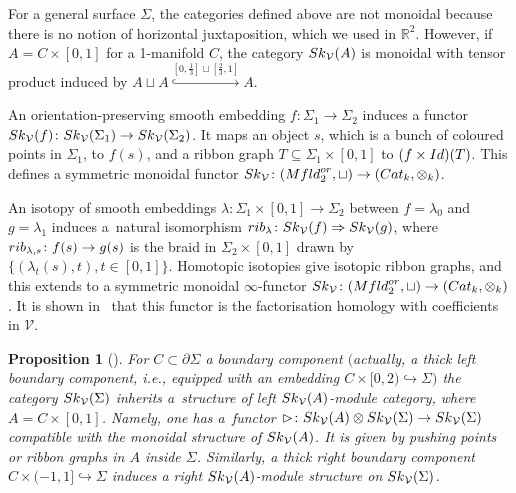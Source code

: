 \documentclass[11pt]{article}
\numberwithin{equation}{section}
\numberwithin{equation}{section}
\newtheorem{Proposition}[Theorem]{Proposition}
 { \theoremstyle{definition}
\newtheorem{Definition}[Theorem]{Definition}
\newtheorem{Note}[Theorem]{Note}
\newtheorem{Example}[Theorem]{Example}
\newtheorem{Remark}[Theorem]{Remark} }
\begin{document}
\begin{Remark}\label{Skmonoidal}
For a general surface $\Sigma$, the categories defined above are not monoidal because there is no notion of horizontal juxtaposition, which we used in $\mathbb{R}^2$. However, if $A = C \times [0,1]$ for a 1-manifold $C$, the category ${\rm Sk}_\mathcal{V}(A)$ is monoidal with tensor product induced by $A \sqcup A \overset{[0,\frac{1}{3}]\sqcup[\frac{2}{3},1]}\hookrightarrow A$.
\end{Remark}

\begin{Remark}\label{rmkFunctEmbIsotOfSkCat} An orientation-preserving smooth embedding $f\colon\Sigma_1 \allowbreak\to \Sigma_2$ induces a functor ${\rm Sk}_\mathcal{V}(f)\colon{\rm Sk}_\mathcal{V}(\Sigma_1)\to {\rm Sk}_\mathcal{V}(\Sigma_2)$. It maps an object $s$, which is a bunch of coloured points in $\Sigma_1$, to $f(s)$, and a ribbon graph $T \subseteq \Sigma_1 \times [0,1]$ to $(f\times {\rm Id})(T)$. This defines a symmetric monoidal functor ${\rm Sk}_\mathcal{V}\colon ({\rm Mfld}_2^{\rm or},\sqcup) \to ({\rm Cat}_k,\otimes_k)$.

An isotopy of smooth embeddings $\lambda \colon \Sigma_1 \times [0,1] \to \Sigma_2$ between $f=\lambda_0$ and $g=\lambda_1$ induces a~natural isomorphism ${\rm rib}_\lambda\colon {\rm Sk}_\mathcal{V}(f) \Rightarrow {\rm Sk}_\mathcal{V}(g)$, where ${\rm rib}_{\lambda,s}\colon f(s) \to g(s)$ is the braid in $\Sigma_2 \times [0,1]$ drawn by $\{(\lambda_t(s),t), t \in [0,1]\}$. Homotopic isotopies give isotopic ribbon graphs, and this extends to a symmetric monoidal $\infty$-functor ${\rm Sk}_\mathcal{V}\colon ({\rm Mfld}_2^{\rm or},\sqcup) \to ({\rm Cat}_k,\otimes_k)$. It is shown in~\cite{Cooke} that this functor is the factorisation homology with coefficients in $\mathcal{V}$.
\end{Remark}

\begin{Proposition}[{\cite[Section~1.3]{Cooke}}]\label{Skmodcat}
For $C\subset \partial \Sigma$ a boundary component $($actually, a thick left boundary component, i.e., equipped with an embedding $C \times [0,2) \hookrightarrow \Sigma)$ the category ${\rm Sk}_\mathcal{V}(\Sigma)$ inherits a~structure of left ${\rm Sk}_\mathcal{V}(A)$-module category, where $A = C\times [0,1]$. Namely, one has a~functor $\rhd\colon {\rm Sk}_\mathcal{V}(A) \otimes {\rm Sk}_\mathcal{V}(\Sigma) \to {\rm Sk}_\mathcal{V}(\Sigma)$ compatible with the monoidal structure of ${\rm Sk}_\mathcal{V}(A)$. It is given by pushing points or ribbon graphs in $A$ inside $\Sigma$.
Similarly, a thick right boundary component $C\times (-1,1]\hookrightarrow \Sigma$ induces a right ${\rm Sk}_\mathcal{V}(A)$-module structure on ${\rm Sk}_\mathcal{V}(\Sigma)$.
\end{Proposition}
\end{document}
